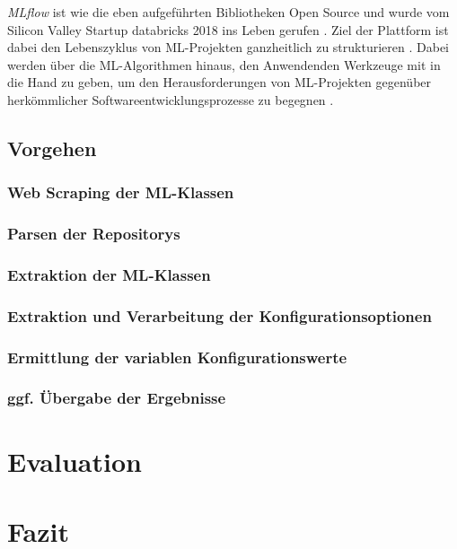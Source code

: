 \documentclass[german,bachelor]{swsLeipzig}
\begin{document}
\textit{MLflow} ist wie die eben aufgeführten Bibliotheken Open Source und wurde vom Silicon Valley Startup databricks 2018 ins Leben gerufen \cite[S. 39]{zaharia2018accelerating}.
Ziel der Plattform ist dabei den Lebenszyklus von ML-Projekten ganzheitlich zu strukturieren \cite[S. 39]{zaharia2018accelerating}.
Dabei werden über die ML-Algorithmen hinaus, den Anwendenden Werkzeuge mit in die Hand zu geben, um den Herausforderungen
von ML-Projekten gegenüber herkömmlicher Softwareentwicklungsprozesse zu begegnen \cite[S. 44]{zaharia2018accelerating}.\\

\section{Vorgehen}

\subsection{Web Scraping der ML-Klassen}

\subsection{Parsen der Repositorys}

\subsection{Extraktion der ML-Klassen}

\subsection{Extraktion und Verarbeitung der Konfigurationsoptionen}

\subsection{Ermittlung der variablen Konfigurationswerte}

\subsection{ggf. Übergabe der Ergebnisse}

\chapter{Evaluation}\label{Evaluation}

\chapter{Fazit}\label{Fazit}
\end{document}
